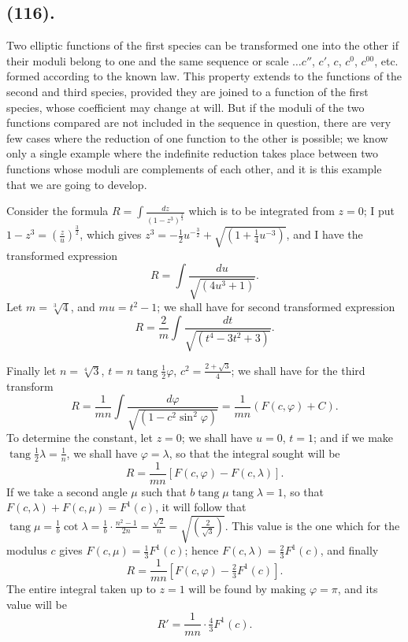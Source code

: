 \documentclass{article}
\begin{document}
\subsection*{(116).}

Two elliptic functions of the first species can be transformed one into the other if their moduli belong to one and the same sequence or scale $\ldots c''$, $c'$, $c$, $c^{0}$, $c^{00}$, etc. formed according to the known law. This property extends to the functions of the second and third species, provided they are joined to a function of the first species, whose coefficient may change at will. But if the moduli of the two functions compared are not included in the sequence in question, there are very few cases where the reduction of one function to the other is possible; we know only a single example where the indefinite reduction takes place between two functions whose moduli are complements of each other, and it is this example that we are going to develop.

Consider the formula $R=\displaystyle\int\frac{dz}{(1-z^{3})^{\frac{2}{3}}}$ which is to be integrated from $z=0$; I put $1-z^{3}=\left(\frac{z}{u}\right)^{\frac{3}{2}}$, which gives $z^{3}=-\frac{1}{2}u^{-\frac{3}{2}}+\sqrt{(1+\frac{1}{4}u^{-3})}$, and I have the transformed expression
\[ R=\int\frac{du}{\sqrt{(4u^{3}+1)}}. \]
Let $m=\sqrt[3]{4}$, and $mu=t^{2}-1$; we shall have for second transformed expression
\[ R=\frac{2}{m}\int\frac{dt}{\sqrt{(t^{4}-3t^{2}+3)}}. \]

Finally let $n=\sqrt[4]{3}$, $t=n\operatorname{tang}\frac{1}{2}\varphi$, $c^{2}=\frac{2+\sqrt{3}}{4}$; we shall have for the third transform
\[ R=\frac{1}{mn}\int\frac{d\varphi}{\sqrt{(1-c^{2}\sin^{2}\varphi)}}=\frac{1}{mn}(F(c,\varphi)+C). \]
To determine the constant, let $z=0$; we shall have $u=0$, $t=1$; and if we make $\operatorname{tang}\frac{1}{2}\lambda=\frac{1}{n}$, we shall have $\varphi=\lambda$, so that the integral sought will be
\[ R=\frac{1}{mn}[F(c,\varphi)-F(c,\lambda)]. \]
If we take a second angle $\mu$ such that $b\operatorname{tang}\mu\operatorname{tang}\lambda=1$, so that $F(c,\lambda)+F(c,\mu)=F^{1}(c)$, it will follow that $\operatorname{tang}\mu=\frac{1}{b}\cot\lambda=\frac{1}{b}\cdot\frac{n^{2}-1}{2n}=\frac{\sqrt{2}}{n}=\sqrt{\left(\frac{2}{\sqrt{3}}\right)}$. This value is the one which for the modulus $c$ gives $F(c,\mu)=\frac{1}{3}F^{1}(c)$; hence $F(c,\lambda)=\frac{2}{3}F^{1}(c)$, and finally
\[ R=\frac{1}{mn}[F(c,\varphi)-\tfrac{2}{3}F^{1}(c)]. \]
The entire integral taken up to $z=1$ will be found by making $\varphi=\pi$, and its value will be
\[ R'=\frac{1}{mn}\cdot\tfrac{4}{3}F^{1}(c). \]
\end{document}

